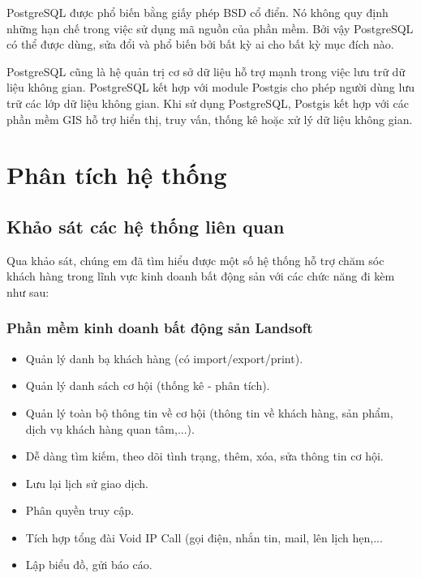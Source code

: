 \documentclass[12pt,a4paper]{article}
\begin{document}
    PostgreSQL được phổ biến bằng giấy phép BSD cổ điển. Nó không quy định những hạn chế trong việc sử dụng mã nguồn của phần mềm. Bởi vậy PostgreSQL có thể được dùng, sửa đổi và phổ biến bởi bất kỳ ai cho bất kỳ mục đích nào.

    PostgreSQL cũng là hệ quản trị cơ sở dữ liệu hỗ trợ mạnh trong việc lưu trữ dữ liệu không gian. PostgreSQL kết hợp với module Postgis cho phép người dùng lưu trữ các lớp dữ liệu không gian. Khi sử dụng PostgreSQL, Postgis kết hợp với các phần mềm GIS hỗ trợ hiển thị, truy vấn, thống kê hoặc xử lý dữ liệu không gian.


    \newpage


    \section{Phân tích hệ thống}

    \subsection{Khảo sát các hệ thống liên quan}
    Qua khảo sát, chúng em đã tìm hiểu được một số hệ thống hỗ trợ chăm sóc khách hàng trong lĩnh vực kinh doanh bất động sản với các chức năng đi kèm như sau:
    \subsubsection*{Phần mềm kinh doanh bất động sản Landsoft}
    \begin{itemize}
        \item Quản lý danh bạ khách hàng (có import/export/print).
        \item Quản lý danh sách cơ hội (thống kê - phân tích).
        \item Quản lý toàn bộ thông tin về cơ hội (thông tin về khách hàng, sản phẩm, dịch vụ khách hàng quan tâm,...).
        \item Dễ dàng tìm kiếm, theo dõi tình trạng, thêm, xóa, sửa thông tin cơ hội.
        \item Lưu lại lịch sử giao dịch.
        \item Phân quyền truy cập.
        \item Tích hợp tổng đài Void IP Call (gọi điện, nhắn tin, mail, lên lịch hẹn,...
        \item Lập biểu đồ, gửi báo cáo.
    \end{itemize}
\end{document}
